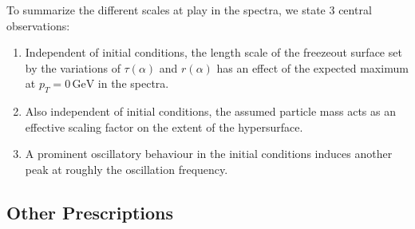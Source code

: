 To summarize the different scales at play in the spectra, we state 3 central observations:
\begin{enumerate}
    \item Independent of initial conditions, the length scale of the freezeout surface set by the variations of $\tau(\alpha)$ and $r(\alpha)$ has an effect of the expected maximum at ${p_T=0\,\text{GeV}}$ in the spectra.
    \item Also independent of initial conditions, the assumed particle mass acts as an effective scaling factor on the extent of the hypersurface.
    \item A prominent oscillatory behaviour in the initial conditions induces another peak at roughly the oscillation frequency.
\end{enumerate}

\subsection{Other Prescriptions}

